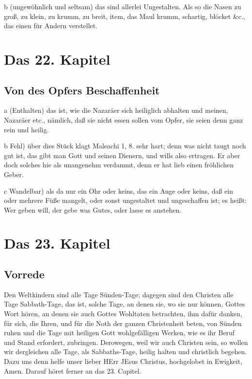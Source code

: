 b (ungewöhnlich und seltsam) das sind allerlei Ungestalten. Als so die Nasen zu groß, zu klein, zu krumm, zu breit, item, das Maul krumm, schartig, blöcket \&c., das einen für Andern verstellet.

\chapter{Das 22. Kapitel}

\section{Von des Opfers Beschaffenheit}

a (Enthalten) das ist, wie die Nazaräer sich heiliglich abhalten und meinen, Nazaräer etc., nämlich, daß sie nicht essen sollen vom Opfer, sie seien denn ganz rein und heilig.

b Fehl) über dies Stück klagt Maleachi 1, 8. sehr hart; denn was nicht taugt noch gut ist, das gibt man Gott und seinen Dienern, und wills also ertragen. Er aber doch solches hie als unangenehm verdammt, denn er hat lieb einen fröhlichen Geber.

c Wandelbar) als da nur ein Ohr oder keins, das ein Auge oder keins, daß ein oder mehrere Füße mangelt, oder sonst ungestaltet und ungeschaffen ist; es heißt: Wer geben will, der gebe was Gutes, oder lasse es anstehen.

\chapter{Das 23. Kapitel}

\section{Vorrede}

Den Weltkindern sind alle Tage Sünden-Tage; dagegen sind den Christen alle Tage Sabbath-Tage, das ist, solche Tage, an denen sie, wo sie nur können, Gottes Wort hören, an denen sie auch Gottes Wohltaten betrachten, ihm dafür danken, für sich, die Ihren, und für die Noth der ganzen Christenheit beten, von Sünden ruhen und die Tage mit heiligen Gott wohlgefälligen Werken, wie es ihr Beruf und Stand erfordert, zubringen. Derowegen, weil wir auch Christen sein, so wollen wir dergleichen alle Tage, als Sabbaths-Tage, heilig halten und christlich begehen. Dazu uns denn helfe unser lieber HErr JEsus Christus, hochgelobet in Ewigkeit, Amen. Darauf höret ferner an das 23. Capitel.

